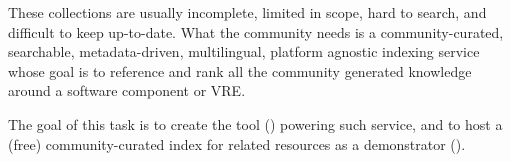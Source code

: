 \begin{workpackage}
\begin{tasklist}
\begin{task}[title=Demonstrator: Computational mathematics resources indexing service,
id=index-librorum-salvificorum,lead=UV,PM=2,partners={UB}]
These collections are usually incomplete, limited in scope, hard to
search, and difficult to keep up-to-date.  What the community needs is a
community-curated, searchable, metadata-driven, multilingual, platform
agnostic indexing service whose goal is to reference and rank all the
community generated knowledge around a software component or VRE.

The goal of this task is to create the tool
() powering such service, and to host a
(free) community-curated index for \TheProject related resources as a
demonstrator ().

\end{task}




\end{tasklist}





\end{workpackage}
